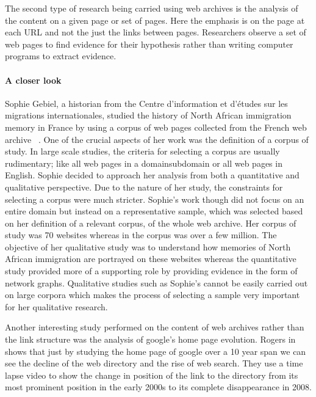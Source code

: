 


The second type of research being carried using web archives is the analysis of the content on a given page or set of pages. Here the emphasis is on the page at each URL and not the just the links between pages. Researchers observe a set of web pages to find evidence for their hypothesis rather than writing computer programs to extract evidence. 

\paragraph{A closer look} %
\label{par:a_closer_look}
Sophie Gebiel, a historian from the Centre d'information et d'{\'e}tudes sur les migrations internationales, studied the history of North African immigration memory in France by using a corpus of web pages collected from the French web archive ~\cite{gebeil2014memoires}. One of the crucial aspects of her work was the definition of a corpus of study. In large scale studies, the criteria for selecting a corpus are usually rudimentary; like all web pages in a domain\/subdomain or all web pages in English. Sophie decided to approach her analysis from both a quantitative and qualitative perspective. Due to the nature of her study, the constraints for selecting a corpus were much stricter. Sophie's work though did not focus on an entire domain but instead on a representative sample, which was selected based on her definition of a relevant corpus, of the whole web archive. Her corpus of study was 70 websites whereas in \cite{hale2014mapping} the corpus was over a few million. The objective of her qualitative study was to understand how memories of North African immigration are portrayed on these websites whereas the quantitative study provided more of a supporting role by providing evidence in the form of network graphs. Qualitative studies such as Sophie's cannot be easily carried out on large corpora which makes the process of selecting a sample very important for her qualitative research. 

Another interesting study performed on the content of web archives rather than the link structure was the analysis of google's home page evolution. Rogers in \cite{rogers2013digital} shows that just by studying the home page of google over a 10 year span we can see the decline of the web directory and the rise of web search. They use a time lapse video to show the change in position of the link to the directory from its most prominent position in the early 2000s to its complete disappearance in 2008.

